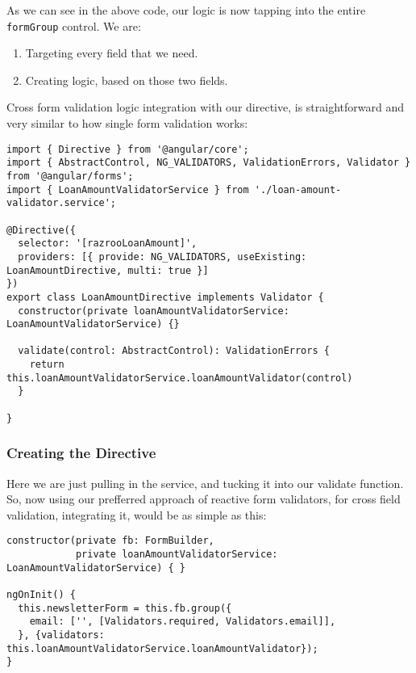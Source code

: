 As we can see in the above code, our logic is now tapping into the entire \lstinline{formGroup} control. We are: 
\begin{enumerate}
  \item Targeting every field that we need.
  \item Creating logic, based on those two fields.    
\end{enumerate}

Cross form validation logic integration with our directive, is straightforward and very similar to how single form validation works: 

\begin{lstlisting}[caption=loan-amount.directive.ts]
import { Directive } from '@angular/core';
import { AbstractControl, NG_VALIDATORS, ValidationErrors, Validator } from '@angular/forms';
import { LoanAmountValidatorService } from './loan-amount-validator.service';

@Directive({
  selector: '[razrooLoanAmount]',
  providers: [{ provide: NG_VALIDATORS, useExisting: LoanAmountDirective, multi: true }]
})
export class LoanAmountDirective implements Validator {
  constructor(private loanAmountValidatorService: LoanAmountValidatorService) {}

  validate(control: AbstractControl): ValidationErrors {
    return this.loanAmountValidatorService.loanAmountValidator(control)
  }

} 
\end{lstlisting}

\subsubsection{Creating the Directive}

Here we are just pulling in the service, and tucking it into our validate function. So, now using our prefferred approach of reactive form validators, for cross field validation, integrating it, would be as simple as this:

\begin{lstlisting}[caption=finance-calculator.component.ts]
constructor(private fb: FormBuilder,
            private loanAmountValidatorService: LoanAmountValidatorService) { }

ngOnInit() {
  this.newsletterForm = this.fb.group({
    email: ['', [Validators.required, Validators.email]],
  }, {validators: this.loanAmountValidatorService.loanAmountValidator});
}
\end{lstlisting}

